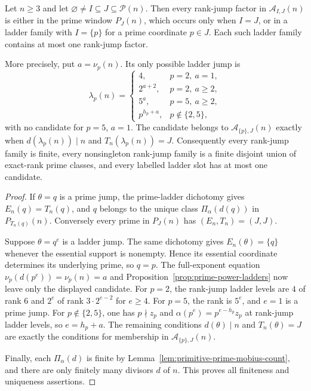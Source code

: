 \begin{proposition}
\label{prop:rank-jump-family-ladder-slots}
Let $n\ge3$ and let $\varnothing\ne I\subseteq J\subseteq\mathcal P(n)$.
Then every rank-jump factor in $\mathcal A_{I,J}(n)$ is either in the prime window
$P_J(n)$, which occurs only when $I=J$, or in a ladder family with
$I=\{p\}$ for a prime coordinate $p\in J$.  Each such ladder family contains
at most one rank-jump factor.

More precisely, put $a=\nu_p(n)$.  Its only possible ladder jump is
\[
\lambda_p(n)=
\begin{cases}
4, & p=2,\ a=1,\\
2^{a+2}, & p=2,\ a\ge2,\\
5^a, & p=5,\ a\ge2,\\
p^{h_p+a}, & p\notin\{2,5\},
\end{cases}
\]
with no candidate for $p=5$, $a=1$.  The candidate belongs to
$\mathcal A_{\{p\},J}(n)$ exactly when
$d(\lambda_p(n))\mid n$ and $T_n(\lambda_p(n))=J$.
Consequently every rank-jump family is finite, every nonsingleton rank-jump family
is a finite disjoint union of exact-rank prime classes, and every labelled
ladder slot has at most one candidate.
\end{proposition}

\begin{proof}
If $\theta=q$ is a prime jump, the prime-ladder dichotomy gives
$E_n(q)=T_n(q)$, and $q$ belongs to the unique class
$\Pi_\alpha(d(q))$ in $P_{T_n(q)}(n)$. Conversely every prime in $P_J(n)$
has $(E_n,T_n)=(J,J)$.

Suppose $\theta=q^e$ is a ladder jump. The same dichotomy gives
$E_n(\theta)=\{q\}$ whenever the essential support is nonempty. Hence its
essential coordinate determines its underlying prime, so $q=p$. The
full-exponent equation
$\nu_p(d(p^e))=\nu_p(n)=a$ and
Proposition~\ref{prop:prime-power-ladders} now leave only the displayed
candidate. For $p=2$, the rank-jump ladder levels are $4$ of rank $6$ and
$2^e$ of rank $3\cdot2^{e-2}$ for $e\ge4$. For $p=5$, the rank is $5^e$,
and $e=1$ is a prime jump. For $p\notin\{2,5\}$, one has
$p\nmid z_p$ and
$\alpha(p^e)=p^{e-h_p}z_p$ at rank-jump ladder levels, so $e=h_p+a$.
The remaining conditions $d(\theta)\mid n$ and $T_n(\theta)=J$ are exactly
the conditions for membership in $\mathcal A_{\{p\},J}(n)$.

Finally, each $\Pi_\alpha(d)$ is finite by
Lemma~\ref{lem:primitive-prime-mobius-count}, and there are only finitely many
divisors $d$ of $n$. This proves all finiteness and uniqueness assertions.
\end{proof}

